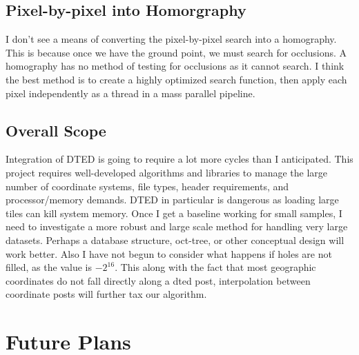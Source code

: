 \documentclass[12pt]{report}
\begin{document}
\subsection*{Pixel-by-pixel into Homorgraphy}
I don't see a means of converting the pixel-by-pixel search into a homography.  This is because
once we have the ground point, we must search for occlusions.  A homography has no method of testing 
for occlusions as it cannot search. I think the best method is to create a highly optimized search function, 
then apply each pixel independently as a thread in a mass parallel pipeline. 

\subsection*{Overall Scope}
Integration of DTED is going to require a lot more cycles than I anticipated.  This project
requires well-developed algorithms and libraries to manage the large number of coordinate systems, file types, 
header requirements, and processor/memory demands.  DTED in particular is dangerous as loading large tiles can 
kill system memory.  Once I get a baseline working for small samples, I need to investigate a more robust and large scale method 
for handling very large datasets. Perhaps a database structure, oct-tree, or other conceptual design will work better. Also I have not begun
to consider what happens if holes are not filled, as the value is $-2^{16}$. This along with the fact that most geographic coordinates
do not fall directly along a dted post, interpolation between coordinate posts will further tax our algorithm.  

\section*{Future Plans}
\end{document}
